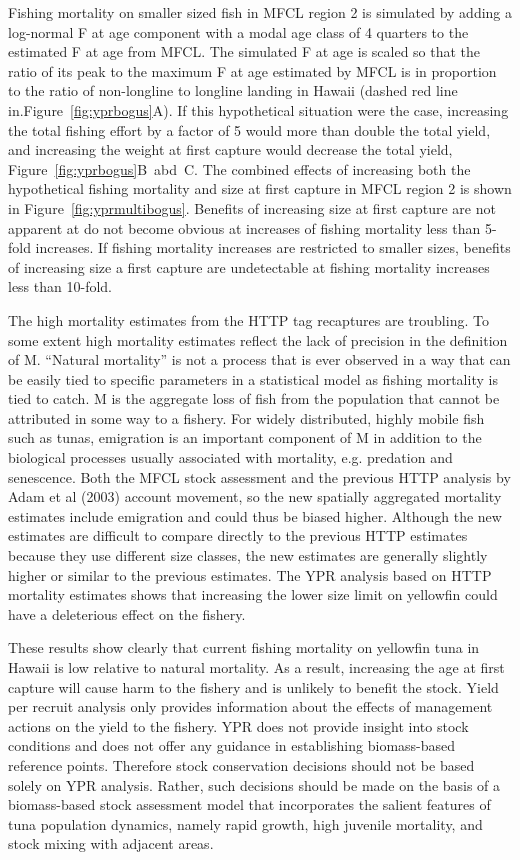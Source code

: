 \documentclass[12pt,letterpaper]{article}
\begin{document}
Fishing mortality on smaller sized fish in MFCL region 2 is simulated
by adding a log-normal F at age component with a modal age class of 4
quarters to the estimated
F at age from MFCL. The simulated F at age is scaled so that the
ratio of its peak to the maximum F at age estimated by MFCL is in
proportion to the ratio of non-longline to longline landing in Hawaii
(dashed red line in.Figure~\ref{fig:yprbogus}A). 
If this hypothetical situation were the case, increasing the total
fishing effort by a factor of 5 would more than double the total
yield, and increasing the weight at first capture would decrease the
total yield, Figure~\ref{fig:yprbogus}B~abd~C. 
The combined effects of increasing both the hypothetical fishing
mortality and size at first capture
in MFCL region 2 is shown in  Figure~\ref{fig:yprmultibogus}.
Benefits of increasing size at first capture are not apparent at
do not become obvious at increases of fishing mortality less than
5-fold increases. If fishing mortality increases are restricted to
smaller sizes, benefits of increasing size a first capture are
undetectable at fishing mortality increases less than 10-fold.


The high mortality estimates from the HTTP tag recaptures are
troubling. To some extent high mortality estimates reflect the
lack of precision in the definition of M. ``Natural mortality'' is not
a process that is ever observed in a way that can be easily tied to
specific parameters in a statistical model as fishing mortality is
tied to catch. M is the aggregate loss of fish from
the population  that cannot be attributed in some way to a
fishery. For widely distributed, highly mobile fish such as tunas,
emigration is an important component of M in addition to the
biological processes usually associated with mortality, e.g. predation and
senescence. Both the MFCL stock assessment and the previous HTTP
analysis by Adam et al (2003) account movement, so the new
spatially aggregated mortality estimates include emigration and could
thus be biased higher.
Although the new estimates are difficult to compare directly to the
previous HTTP estimates because they use different size
classes, the new estimates are generally slightly higher or similar to
the previous estimates. 
The YPR analysis based on HTTP mortality estimates shows that
increasing the lower size limit on yellowfin could have a deleterious
effect on the fishery.

These results show clearly that current fishing mortality on yellowfin
tuna in Hawaii is low relative to natural mortality. As a result,
increasing the age at first capture will cause harm to the fishery and
is unlikely to benefit the stock.
Yield per recruit analysis only provides information about the effects
of management actions on the yield to the fishery. YPR does not
provide insight into stock conditions and does not offer any guidance
in establishing biomass-based reference points. Therefore stock conservation
decisions should not be based solely on YPR analysis. Rather, such
decisions should be made on the basis of a biomass-based stock
assessment model that incorporates the salient features of tuna
population dynamics, namely rapid growth, high juvenile mortality,
and stock mixing with adjacent areas.
\end{document}
